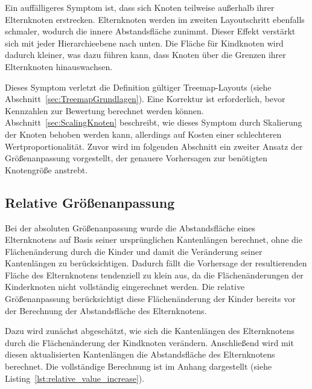 Ein auffälligeres Symptom ist, dass sich Knoten teilweise außerhalb ihrer Elternknoten erstrecken. Elternknoten werden im zweiten Layoutschritt ebenfalls schmaler, wodurch die innere Abstandsfläche zunimmt. Dieser Effekt verstärkt sich mit jeder Hierarchieebene nach unten. Die Fläche für Kindknoten wird dadurch kleiner, was dazu führen kann, dass Knoten über die Grenzen ihrer Elternknoten hinauswachsen.

Dieses Symptom verletzt die Definition gültiger Treemap-Layouts (siehe Abschnitt~\ref{sec:TreemapGrundlagen}). Eine Korrektur ist erforderlich, bevor Kennzahlen zur Bewertung berechnet werden können. Abschnitt~\ref{sec:ScalingKnoten} beschreibt, wie dieses Symptom durch Skalierung der Knoten behoben werden kann, allerdings auf Kosten einer schlechteren Wertproportionalität. Zuvor wird im folgenden Abschnitt ein zweiter Ansatz der Größenanpassung vorgestellt, der genauere Vorhersagen zur benötigten Knotengröße anstrebt.

\subsection{Relative Größenanpassung} \label{sec:RelativeGrößenanpassung}

Bei der absoluten Größenanpassung wurde die Abstandsfläche eines Elternknotens auf Basis seiner ursprünglichen Kantenlängen berechnet, ohne die Flächenänderung durch die Kinder und damit die Veränderung seiner Kantenlängen zu berücksichtigen. Dadurch fällt die Vorhersage der resultierenden Fläche des Elternknotens tendenziell zu klein aus, da die Flächenänderungen der Kinderknoten nicht vollständig eingerechnet werden. Die relative Größenanpassung berücksichtigt diese Flächenänderung der Kinder bereits vor der Berechnung der Abstandsfläche des Elternknotens.

Dazu wird zunächst abgeschätzt, wie sich die Kantenlängen des Elternknotens durch die Flächenänderung der Kindknoten verändern. Anschließend wird mit diesen aktualisierten Kantenlängen die Abstandsfläche des Elternknotens berechnet. Die vollständige Berechnung ist im Anhang dargestellt (siehe Listing~\ref{lst:relative_value_increase}).

